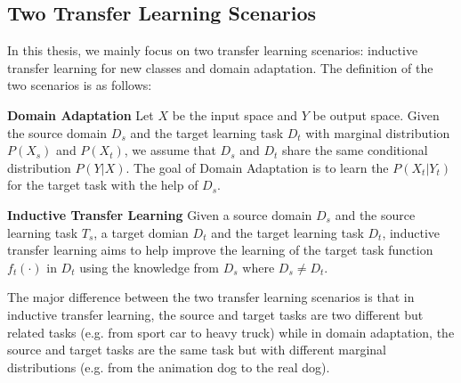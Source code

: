 \subsection{Two Transfer Learning Scenarios}
In this thesis, we mainly focus on two transfer learning scenarios: inductive transfer learning for new classes and domain adaptation. The definition of the two scenarios is as follows:
\begin{definition}{\textbf{Domain Adaptation}\cite{ben2010theory}}
	Let $X$ be the input space and $Y$ be output space. Given the source domain $D_s$ and the target learning task $D_t$ with marginal distribution $P(X_s)$ and $P(X_t)$, we assume that $D_s$ and $D_t$ share the same conditional distribution $P(Y|X)$. The goal of Domain Adaptation is to learn the $P(X_t|Y_t)$ for the target task with the help of $D_s$.
\end{definition}

\begin{definition}{\textbf{Inductive Transfer Learning}}\cite{pan2010survey}
	Given a source domain $D_s$ and the source learning task $T_s$, a target domian $D_t$ and the target learning task $D_t$, inductive transfer learning aims to help improve the learning of the target task function $f_t(\cdot)$ in $D_t$ using the knowledge from $D_s$ where $D_s \neq D_t$.
\end{definition}

The major difference between the two transfer learning scenarios is that in inductive transfer learning, the source and target tasks are two different but related tasks (e.g. from sport car to heavy truck) while in domain adaptation, the source and target tasks are the same task but with different marginal distributions (e.g. from the animation dog to the real dog). 

